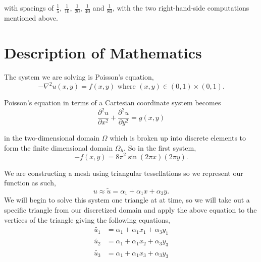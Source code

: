 \documentclass[11pt, oneside]{article}   	%
\begin{document}
with spacings of $\frac{1}{5}$, $\frac{1}{10}$, $\frac{1}{20}$, $\frac{1}{40}$ and $\frac{1}{80}$, with the two right-hand-side computations mentioned above.

\section{Description of Mathematics}

The system we are solving is Poisson's equation,
\[
-\nabla^2 u(x,y) = f(x,y) \text{ where } (x,y) \in (0,1) \times (0,1).
\]

Poisson's equation in terms of a Cartesian coordinate system becomes 
\[
\frac{\partial^2 u}{\partial x^2} + \frac{\partial^2 u}{\partial y^2} = g(x,y)
\]

in the two-dimensional domain $\Omega$ which is broken up into discrete elements to form the finite dimensional domain $\Omega_h$. So in the first system,
\[
-f(x,y) = 8 \pi^2 \sin(2 \pi x)(2 \pi y).
\]

We are constructing a mesh using triangular tessellations so we represent our function as such,
\[
u \approx \tilde{u} = \alpha_1 + \alpha_1 x + \alpha_3 y.
\]
We will begin to solve this system one triangle at at time, so we will take out a specific triangle from our discretized domain and apply the above equation to the vertices of the triangle giving the following equations,
\begin{align*}
\tilde{u_1} &= \alpha_1 + \alpha_1 x_1 + \alpha_3 y_1\\
\tilde{u_2} &= \alpha_1 + \alpha_1 x_2 + \alpha_3 y_3\\
\tilde{u_3} &= \alpha_1 + \alpha_1 x_3 + \alpha_3 y_3\\
\end{align*}
\end{document}
